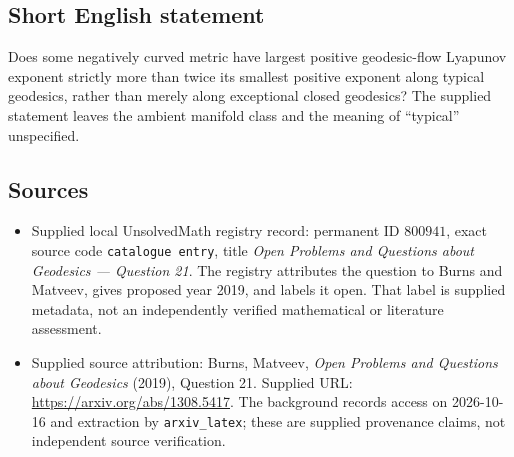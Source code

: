 \documentclass[11pt]{article}
\begin{document}
\subsection{Short English statement}
Does some negatively curved metric have largest positive geodesic-flow Lyapunov exponent strictly more than twice its smallest positive exponent along typical geodesics, rather than merely along exceptional closed geodesics? The supplied statement leaves the ambient manifold class and the meaning of ``typical'' unspecified.
\subsection{Sources}
\begin{itemize}
\item Supplied local UnsolvedMath registry record: permanent ID \(800941\), exact source code \texttt{catalogue entry}, title \emph{Open Problems and Questions about Geodesics --- Question 21}. The registry attributes the question to Burns and Matveev, gives proposed year 2019, and labels it open. That label is supplied metadata, not an independently verified mathematical or literature assessment.
\item Supplied source attribution: Burns, Matveev, \emph{Open Problems and Questions about Geodesics} (2019), Question 21. Supplied URL: \url{https://arxiv.org/abs/1308.5417}. The background records access on 2026-10-16 and extraction by \texttt{arxiv\_latex}; these are supplied provenance claims, not independent source verification.
\end{itemize}
\end{document}
